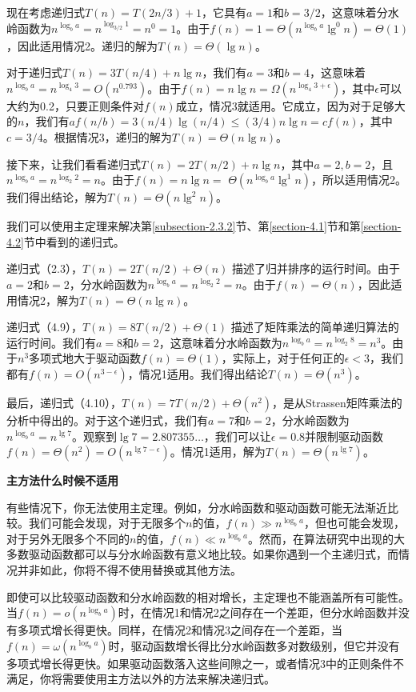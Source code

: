 \documentclass[lang=cn,newtx,10pt,scheme=chinese]{elegantbook}
\begin{document}
现在考虑递归式$T(n)=T(2n/3)+1$，它具有$a=1$和$b=3/2$，这意味着分水岭函数为$n^{\log _b a}=n^{\log _{3 / 2} 1}=n^0=1$。由于$f(n)=1=\Theta(n^{\log _b a} \lg ^0 n)=\Theta(1)$，因此适用情况2。递归的解为$T(n)=\Theta(\lg n)$。

对于递归式$T(n)=3T(n/4)+n\lg n$，我们有$a=3$和$b=4$，这意味着$n^{\log _b a}=n^{\log _4 3}=O(n^{0.793})$。由于$f(n)=n \lg n=\Omega(n^{\log _4 3+\epsilon})$，其中$\epsilon$可以大约为0.2，只要正则条件对$f(n)$成立，情况3就适用。它成立，因为对于足够大的$n$，我们有$af(n/b)=3(n/4)\lg(n/4)\leq(3/4) n \lg n=c f(n)$，其中$c=3/4$。根据情况3，递归的解为$T(n)=\Theta(n\lg n)$。

接下来，让我们看看递归式$T(n)=2 T(n / 2)+n \lg n$，其中$a=2, b=2$，且$n^{\log _b a}=n^{\log _2 2}=n$。由于$f(n)=n \lg n=$ $\Theta(n^{\log _b a} \lg ^1 n)$，所以适用情况2。我们得出结论，解为$T(n)=\Theta(n \lg ^2 n)$。

我们可以使用主定理来解决第\ref{subsection-2.3.2}节、第\ref{section-4.1}节和第\ref{section-4.2}节中看到的递归式。

递归式（2.3），$T(n)=2 T(n / 2)+\Theta(n)$ 描述了归并排序的运行时间。由于$a=2$和$b=2$，分水岭函数为$n^{\log _b a}=n^{\log _2 2}=n$。由于$f(n)=\Theta(n)$，因此适用情况2，解为$T(n)=\Theta(n \lg n)$。

递归式（4.9），$T(n)=8T(n/2)+\Theta(1)$ 描述了矩阵乘法的简单递归算法的运行时间。我们有$a=8$和$b=2$，这意味着分水岭函数为$n^{\log _b a}=n^{\log _2 8}=n^3$。由于$n^3$多项式地大于驱动函数$f(n)=\Theta(1)$，实际上，对于任何正的$\epsilon<3$，我们都有$f(n)=O(n^{3-\epsilon})$，情况1适用。我们得出结论$T(n)=\Theta(n^3)$。

最后，递归式（4.10），$T(n)=7 T(n / 2)+\Theta(n^2)$，是从Strassen矩阵乘法的分析中得出的。对于这个递归式，我们有$a=7$和$b=2$，分水岭函数为$n^{\log _b a}=n^{\lg 7}$。观察到$\lg 7=2.807355 \ldots$，我们可以让$\epsilon=0.8$并限制驱动函数$f(n)=\Theta(n^2)=O(n^{\lg 7-\epsilon})$。情况1适用，解为$T(n)=\Theta(n^{\lg 7})$。

\textbf{主方法什么时候不适用}

有些情况下，你无法使用主定理。例如，分水岭函数和驱动函数可能无法渐近比较。我们可能会发现，对于无限多个$n$的值，$f(n) \gg n^{\log _b a}$，但也可能会发现，对于另外无限多个不同的$n$的值，$f(n) \ll n^{\log _b a}$。然而，在算法研究中出现的大多数驱动函数都可以与分水岭函数有意义地比较。如果你遇到一个主递归式，而情况并非如此，你将不得不使用替换或其他方法。

即使可以比较驱动函数和分水岭函数的相对增长，主定理也不能涵盖所有可能性。当$f(n)=o(n^{\log _b a})$时，在情况1和情况2之间存在一个差距，但分水岭函数并没有多项式增长得更快。同样，在情况2和情况3之间存在一个差距，当$f(n)=\omega(n^{\log _b a})$时，驱动函数增长得比分水岭函数多对数级别，但它并没有多项式增长得更快。如果驱动函数落入这些间隙之一，或者情况3中的正则条件不满足，你将需要使用主方法以外的方法来解决递归式。
\end{document}
